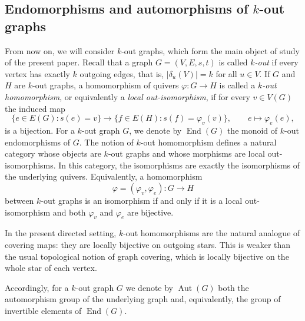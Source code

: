\documentclass[a4paper,10pt]{amsart}
\theoremstyle{plain}
\theoremstyle{definition}
\newtheorem{remark}[theorem]{Remark}
\DeclareMathOperator{\Aut}{Aut}
\DeclareMathOperator{\End}{End}
\DeclareMathOperator{\Cong}{Cong}
\begin{document}




\subsection{Endomorphisms and automorphisms of $k$-out graphs}
From now on, we will consider $k$-out graphs, which form the main object of study of the present paper. Recall that a graph $G=(V,E,s,t)$ is called \emph{$k$-out} if every vertex has exactly $k$ outgoing edges, that is, $|\delta_u(V)|=k$ for all $u\in V$.
If $G$ and $H$ are $k$-out graphs, a homomorphism of quivers $\varphi:G\to H$ is called a \emph{$k$-out homomorphism}, or equivalently a \emph{local out-isomorphism}, if for every $v\in V(G)$ the induced map
\[
\{e\in E(G): s(e)=v\}\longrightarrow \{f\in E(H): s(f)=\varphi_v(v)\},\qquad e\mapsto \varphi_e(e),
\]
is a bijection.
For a $k$-out graph $G$, we denote by $\End(G)$ the monoid of $k$-out endomorphisms of $G$.
The notion of $k$-out homomorphism defines a natural category whose objects are $k$-out graphs and whose morphisms are local out-isomorphisms. In this category, the isomorphisms are exactly the isomorphisms of the underlying quivers. Equivalently, a homomorphism
\[
\varphi=(\varphi_v,\varphi_e):G\to H
\]
between $k$-out graphs is an isomorphism if and only if it is a local out-isomorphism and both $\varphi_v$ and $\varphi_e$ are bijective.

In the present directed setting, $k$-out homomorphisms are the natural analogue of covering maps: they are locally bijective on outgoing stars. This is weaker than the usual topological notion of graph covering, which is locally bijective on the whole star of each vertex.

Accordingly, for a $k$-out graph $G$ we denote by $\Aut(G)$ both the automorphism group of the underlying graph and, equivalently, the group of invertible elements of $\End(G)$.
\end{document}
